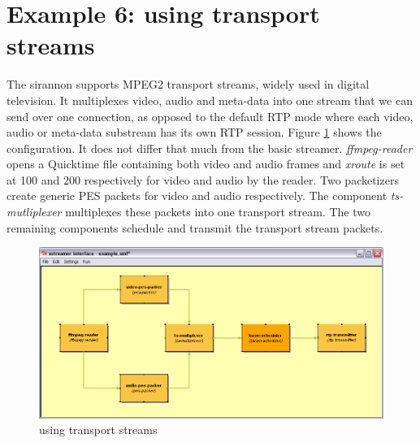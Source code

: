 \documentclass[12pt]{report}
\begin{document}
\section{Example 6: using transport streams}
The sirannon supports MPEG2 transport streams, widely used in digital television. It multiplexes video, audio and meta-data into one stream that we can send over one connection, as opposed to the default RTP mode where each video, audio or meta-data substream has its own RTP session. Figure \ref{fig:ex:6} shows the configuration. It does not differ that much from the basic streamer. \textit{ffmpeg-reader} opens a Quicktime file containing both video and audio frames and  \textit{xroute} is set at 100 and 200 respectively for video and audio by the reader. Two packetizers create generic PES packets for video and audio respectively. The component \textit{ts-mutliplexer} multiplexes these packets into one transport stream. The two remaining components schedule and transmit the transport stream packets.
\begin{center}
\begin{figure}[!ht]
	\includegraphics[width=1.0\textwidth]{./images/ex06.png}
	\caption{using transport streams}
	\label{fig:ex:6}
\end{figure}
\end{center}
\newpage
\end{document}
